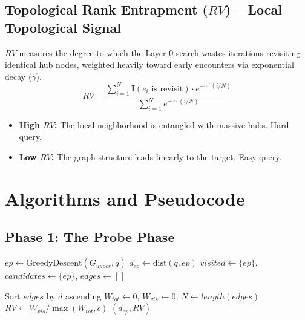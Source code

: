 \documentclass{article}
\begin{document}
\subsection{Topological Rank Entrapment ($RV$) -- Local Topological Signal}
$RV$ measures the degree to which the Layer-0 search wastes iterations revisiting identical hub nodes, weighted heavily toward early encounters via exponential decay ($\gamma$).
\begin{equation}
    RV = \frac{\sum_{i=1}^N \mathbf{I}(e_i \text{ is revisit}) \cdot e^{-\gamma \cdot (i/N)}}{\sum_{i=1}^N e^{-\gamma \cdot (i/N)}}
\end{equation}
\begin{itemize}
    \item \textbf{High $RV$:} The local neighborhood is entangled with massive hubs. Hard query.
    \item \textbf{Low $RV$:} The graph structure leads linearly to the target. Easy query.
\end{itemize}

\section{Algorithms and Pseudocode}

\subsection{Phase 1: The Probe Phase}
\begin{algorithm}[H]
\DontPrintSemicolon
\SetAlgoLined
{}

$ep \leftarrow \text{GreedyDescent}(G_{upper}, q)$ 
$d_{ep} \leftarrow \text{dist}(q, ep)$\;
$visited \leftarrow \{ep\}$, $candidates \leftarrow \{ep\}$, $edges \leftarrow []$\;

Sort $edges$ by $d$ ascending\;
$W_{tot} \leftarrow 0$, $W_{vis} \leftarrow 0$, $N \leftarrow length(edges)$\;
$RV \leftarrow W_{vis} / \max(W_{tot}, \epsilon)$\;
\Return $(d_{ep}, RV)$
\caption{HNSW Dual-Metric Probe Extraction}
\end{algorithm}
\end{document}
